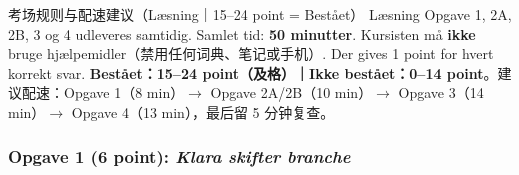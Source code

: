 

\begin{tipbox}{考场规则与配速建议（Læsning｜15--24 point = Bestået）}
\small
Læsning Opgave 1, 2A, 2B, 3 og 4 udleveres samtidig. Samlet tid: \textbf{50 minutter}. Kursisten må \textbf{ikke} bruge hjælpemidler（禁用任何词典、笔记或手机）. Der gives 1 point for hvert korrekt svar. \textbf{Bestået：15--24 point（及格）｜Ikke bestået：0--14 point}。建议配速：Opgave 1（8 min）$\rightarrow$ Opgave 2A/2B（10 min）$\rightarrow$ Opgave 3（14 min）$\rightarrow$ Opgave 4（13 min），最后留 5 分钟复查。
\end{tipbox}

\subsubsection*{Opgave 1 (6 point): \textit{Klara skifter branche}}


